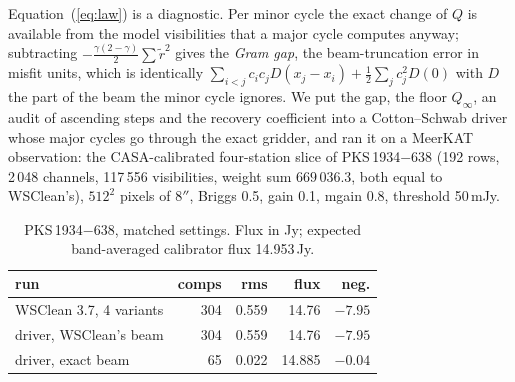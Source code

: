 \documentclass[twocolumn,10pt]{article}
\theoremstyle{remark}
\newcommand{\Qinf}{Q_\infty}
\begin{document}
Equation~(\ref{eq:law}) is a diagnostic. Per minor cycle the exact change of $Q$ is available from the model visibilities that a major cycle computes anyway; subtracting $-\tfrac{\gamma(2-\gamma)}{2}\sum\tilde r^2$ gives the \emph{Gram gap}, the beam-truncation error in misfit units, which is identically $\sum_{i<j}c_ic_jD(x_j-x_i)+\tfrac12\sum_jc_j^2D(0)$ with $D$ the part of the beam the minor cycle ignores. We put the gap, the floor $\Qinf$, an audit of ascending steps and the recovery coefficient into a Cotton--Schwab driver whose major cycles go through the exact gridder, and ran it on a MeerKAT observation: the CASA-calibrated four-station slice of PKS\,1934$-$638 (192 rows, 2\,048 channels, 117\,556 visibilities, weight sum $669\,036.3$, both equal to WSClean's), $512^2$ pixels of $8''$, Briggs 0.5, gain 0.1, mgain 0.8, threshold 50\,mJy.

\begin{table}
\centering
\caption{PKS\,1934$-$638, matched settings. Flux in Jy; expected band-averaged calibrator flux 14.953\,Jy.}
\label{tab:real}
\footnotesize
\begin{tabular}{@{}lrrrr@{}}
\toprule
run & comps & rms & flux & neg.\\
\midrule
WSClean 3.7, 4 variants & 304 & 0.559 & 14.76 & $-7.95$\\
driver, WSClean's beam & 304 & 0.559 & 14.76 & $-7.95$\\
driver, exact beam & 65 & 0.022 & 14.885 & $-0.04$\\
\bottomrule
\end{tabular}
\end{table}
\end{document}
